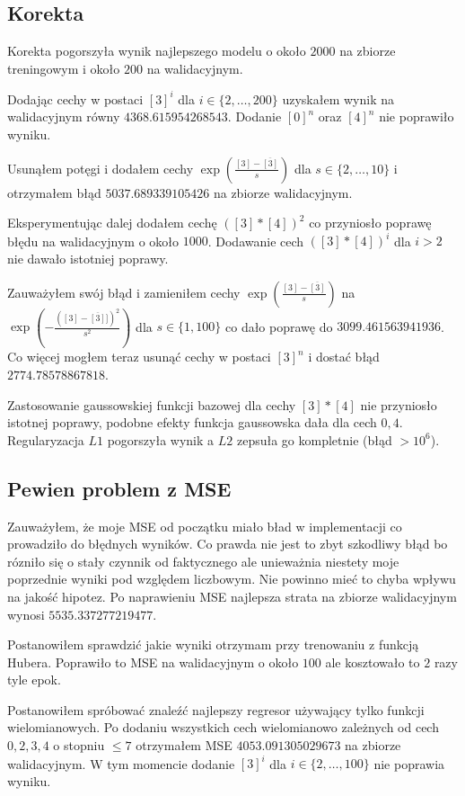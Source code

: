 \documentclass{article}
\begin{document}
  \subsection{Korekta}
  Korekta pogorszyła wynik najlepszego modelu o około $2000$ na zbiorze treningowym i około $200$ na walidacyjnym.

  Dodając cechy w postaci $[3]^i$ dla $i\in\{2,\ldots, 200\}$ uzyskałem wynik na walidacyjnym równy $4368.615954268543$. 
  Dodanie $[0]^n$ oraz $[4]^n$ nie poprawiło wyniku.

  Usunąłem potęgi i dodałem cechy $\exp\left(\frac{[3]-\overline{[3]}}{s}\right)$ dla $s\in\{2,\ldots,10\}$ i otrzymałem błąd
  $5037.689339105426$ na zbiorze walidacyjnym.

  Eksperymentując dalej dodałem cechę $([3]*[4])^2$ co przyniosło poprawę błędu na walidacyjnym o około $1000$. 
  Dodawanie cech $([3]*[4])^i$ dla $i > 2$ nie dawało istotniej poprawy.

  Zauważyłem swój błąd i zamieniłem cechy $\exp\left(\frac{[3]-\overline{[3]}}{s}\right)$ na $\exp\left(-\frac{\left([3]-\overline{[3]}]\right)^2}{s^2}\right)$ dla $s\in\{1, 100\}$ 
  co dało poprawę do $3099.461563941936$. Co więcej mogłem teraz usunąć cechy w postaci $[3]^n$ i dostać błąd $2774.78578867818$.

  Zastosowanie gaussowskiej funkcji bazowej dla cechy $[3]*[4]$ nie przyniosło istotnej poprawy, podobne efekty funkcja gaussowska dała dla cech $0, 4$. 
  Regularyzacja $L1$ pogorszyła wynik a $L2$ zepsuła go kompletnie (błąd $>10^6$).

  \subsection{Pewien problem z MSE}
  Zauważyłem, że moje MSE od początku miało bład w implementacji co prowadziło do błędnych wyników. 
  Co prawda nie jest to zbyt szkodliwy błąd bo rózniło się o stały czynnik od faktycznego ale unieważnia niestety moje poprzednie wyniki pod względem liczbowym. 
  Nie powinno mieć to chyba wpływu na jakość hipotez. Po naprawieniu MSE najlepsza strata na zbiorze walidacyjnym wynosi $5535.337277219477$.

  Postanowiłem sprawdzić jakie wyniki otrzymam przy trenowaniu z funkcją Hubera. Poprawiło to MSE na walidacyjnym o około $100$ ale kosztowało to $2$ razy tyle epok.
  

  Postanowiłem spróbować znaleźć najlepszy regresor używający tylko funkcji wielomianowych. 
  Po dodaniu wszystkich cech wielomianowo zależnych od cech $0,2,3,4$ o stopniu $\le 7$ otrzymałem MSE $4053.091305029673$ na zbiorze walidacyjnym.
  W tym momencie dodanie $[3]^i$ dla $i\in\{2,\ldots, 100\}$ nie poprawia wyniku.
\end{document}

